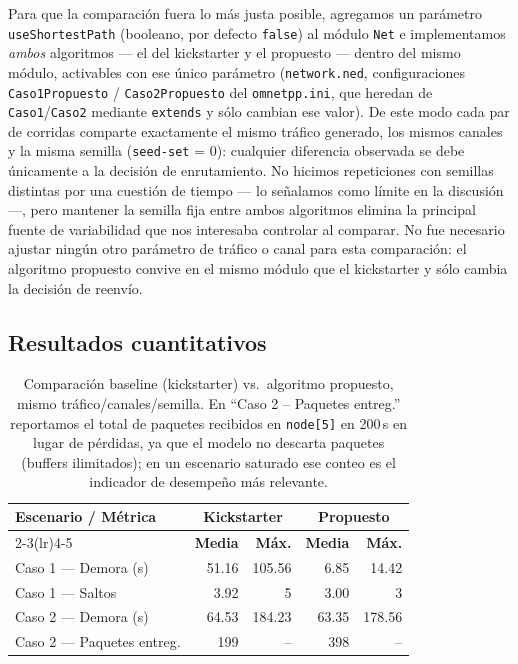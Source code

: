 \documentclass[10pt,letterpaper,twocolumn]{article}
\begin{document}
Para que la comparación fuera lo más justa posible, agregamos un parámetro
\texttt{useShortestPath} (booleano, por defecto \texttt{false}) al módulo
\texttt{Net} e implementamos \emph{ambos} algoritmos --- el del kickstarter y
el propuesto --- dentro del mismo módulo, activables con ese único parámetro
(\texttt{network.ned}, configuraciones \texttt{Caso1Propuesto} /
\texttt{Caso2Propuesto} del \texttt{omnetpp.ini}, que heredan de
\texttt{Caso1}/\texttt{Caso2} mediante \texttt{extends} y sólo cambian ese
valor). De este modo cada par de corridas comparte exactamente el mismo
tráfico generado, los mismos canales y la misma semilla
(\texttt{seed-set} = 0): cualquier diferencia observada se debe únicamente a la
decisión de enrutamiento. No hicimos repeticiones con semillas distintas por
una cuestión de tiempo --- lo señalamos como límite en la discusión ---, pero
mantener la semilla fija entre ambos algoritmos elimina la principal fuente de
variabilidad que nos interesaba controlar al comparar. No fue necesario ajustar
ningún otro parámetro de tráfico o canal para esta comparación: el algoritmo
propuesto convive en el mismo módulo que el kickstarter y sólo cambia la
decisión de reenvío.

\subsection{Resultados cuantitativos}

\begin{table}[!t]
  \centering
  \caption{Comparación baseline (kickstarter) vs.\ algoritmo propuesto, mismo
  tráfico/canales/semilla. En ``Caso 2 -- Paquetes entreg.'' reportamos el total
  de paquetes recibidos en \texttt{node[5]} en 200\,s en lugar de pérdidas, ya
  que el modelo no descarta paquetes (buffers ilimitados); en un escenario
  saturado ese conteo es el indicador de desempeño más relevante.}
  \label{tab:comparacion}
  \begin{tabular}{@{}lrrrr@{}}
    \toprule
    \multirow{2}{*}{\textbf{Escenario / Métrica}} &
    \multicolumn{2}{c}{\textbf{Kickstarter}} &
    \multicolumn{2}{c}{\textbf{Propuesto}} \\
    \cmidrule(lr){2-3}\cmidrule(lr){4-5}
    & \textbf{Media} & \textbf{Máx.} & \textbf{Media} & \textbf{Máx.} \\
    \midrule
    Caso 1 — Demora (s)        & 51.16 & 105.56 & 6.85  & 14.42  \\
    Caso 1 — Saltos            & 3.92  & 5      & 3.00  & 3      \\
    Caso 2 — Demora (s)        & 64.53 & 184.23 & 63.35 & 178.56 \\
    Caso 2 — Paquetes entreg.  & 199   & --     & 398   & --     \\
    \bottomrule
  \end{tabular}
\end{table}
\end{document}
